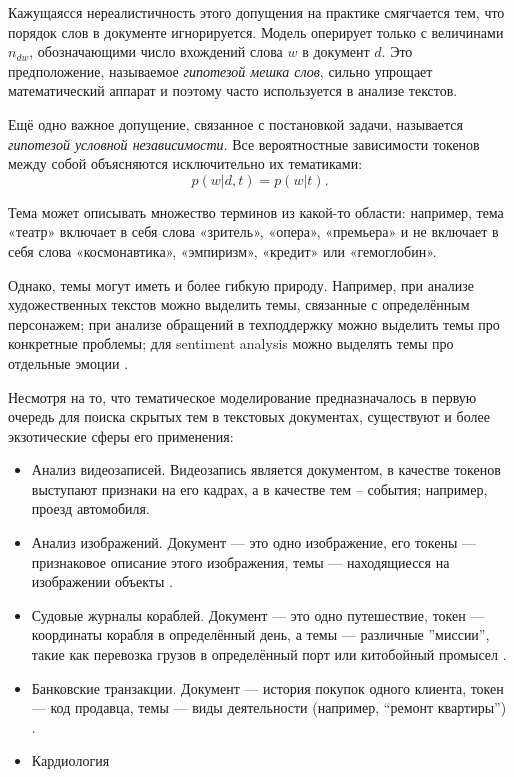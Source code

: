 Кажущаясся нереалистичность этого допущения на практике смягчается тем, что порядок слов в документе игнорируется. Модель оперирует только с величинами $n_{dw}$, обозначающими число вхождений слова $w$ в документ $d$. Это предположение, называемое  \textit{гипотезой мешка слов}, сильно упрощает математический аппарат и поэтому часто используется в анализе текстов.

Ещё одно важное допущение, связанное с постановкой задачи, называется \textit{гипотезой условной независимости}. Все вероятностные зависимости токенов между собой объясняются исключительно их тематиками:
\begin{equation}
    p(w| d,t) = p(w| t).
\end{equation}

Тема может описывать множество терминов из какой-то области: например, тема «театр» включает в себя слова «зритель», «опера», «премьера» и не включает в себя слова «космонавтика», «эмпиризм», «кредит» или «гемоглобин». 

Однако, темы могут иметь и более гибкую природу. Например, при анализе художественных текстов можно выделить темы, связанные с определённым персонажем; при анализе обращений в техподдержку можно выделить темы про конкретные проблемы; для sentiment analysis можно выделять темы про отдельные эмоции \cite{TODO}.

Несмотря на то, что тематическое моделирование предназначалось в первую очередь для поиска скрытых тем в текстовых документах, существуют и более экзотические сферы его применения:

\begin{itemize}
    \item Анализ видеозаписей. Видеозапись является документом, в качестве токенов выступают признаки на его кадрах, а в качестве тем – события; например, проезд автомобиля\cite{sparse}.
    \item Анализ изображений. Документ --- это одно изображение, его токены --- признаковое описание этого изображения, темы --- находящиесся на изображении объекты \cite{mml1}.
    \item Судовые журналы кораблей. Документ --- это одно путешествие, токен --- координаты корабля в определённый день, а темы --- различные ''миссии'', такие как перевозка грузов в определённый порт или китобойный промысел \cite{dh_sea}. 
    \item Банковские транзакции. Документ --- история покупок одного клиента, токен --- код продавца, темы --- виды деятельности (например, ``ремонт квартиры'') \cite{TODO}.
    \item Кардиология \cite{TODO}
\end{itemize}

